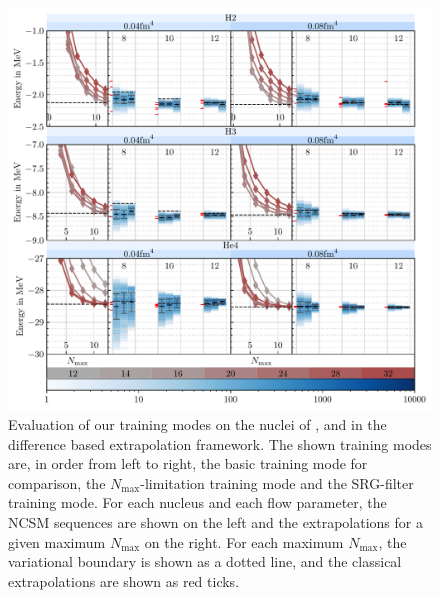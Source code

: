 \begin{figure}[H]
  \includegraphics[width=\textwidth]{media/diff_evaluation.pdf}
  \caption{Evaluation of our training modes on the nuclei of ,  and  in the difference based extrapolation framework. The shown training modes are, in order from left to right, the basic training mode for comparison, the $N_\mathrm{max}$-limitation training mode and the SRG-filter training mode. For each nucleus and each flow parameter, the NCSM sequences are shown on the left and the extrapolations for a given maximum $N_\mathrm{max}$ on the right. For each maximum $N_\mathrm{max}$, the variational boundary is shown as a dotted line, and the classical extrapolations are shown as red ticks.}
  \label{fig:eval_diff}
\end{figure}

